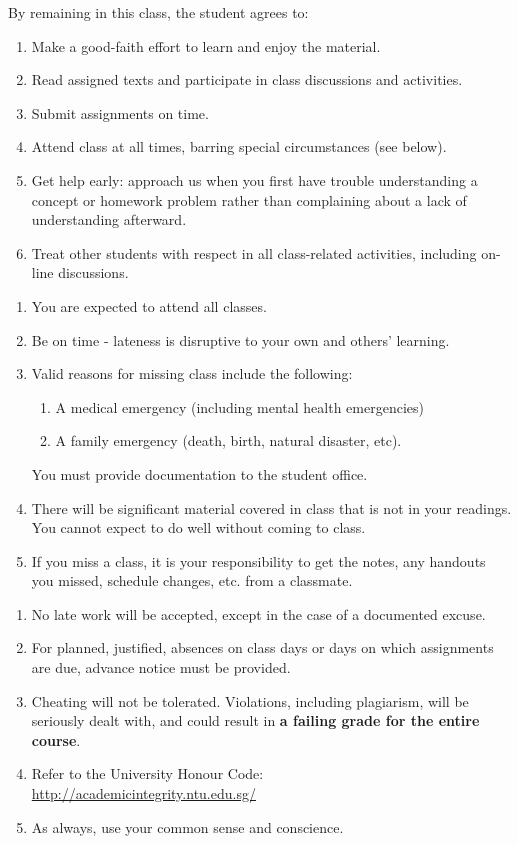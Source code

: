 \documentclass[a4paper,landscape,headrule,footrule,xetex,25pt]{foils}
\begin{document}
By remaining in this class, the student agrees to:
\begin{enumerate}
\item  Make a good-faith effort to learn and enjoy the material.
\item  Read assigned texts and participate in class discussions and activities.
\item Submit assignments on time.
\item Attend class at all times, barring special circumstances (see below).
\item Get help early: approach us when you first have trouble understanding a concept or homework problem rather than complaining about a lack of understanding afterward.
\item Treat other students with respect in all class-related activities, including on-line discussions.
\end{enumerate}
\begin{enumerate}
\item You are expected to attend all classes.
\item Be on time - lateness is disruptive to your own and others' learning.
\item Valid reasons for missing class include the following:
\begin{enumerate}
\item A medical emergency (including mental health emergencies)
\item A family emergency (death, birth, natural disaster, etc).
\end{enumerate}
You must provide documentation to the student office.
\item There will be significant material covered in class that is not in your readings.  You cannot expect to do well without coming to class.
\item If you miss a class, it is your responsibility to get the notes, any handouts you missed, schedule changes, etc. from a classmate.
\end{enumerate}

\begin{enumerate}
\item No late work will be accepted, except in the case of a documented excuse.
\item For planned, justified, absences on class days or days on which assignments are due, advance notice must be provided.
\item Cheating will not be tolerated. Violations, including plagiarism, will be seriously dealt with, and could result in \textbf{a failing grade for the entire course}.
\item Refer to the University Honour Code: 
\\ \url{http://academicintegrity.ntu.edu.sg/}
\item As always, use your common sense and conscience.
\end{enumerate}
\end{document}

